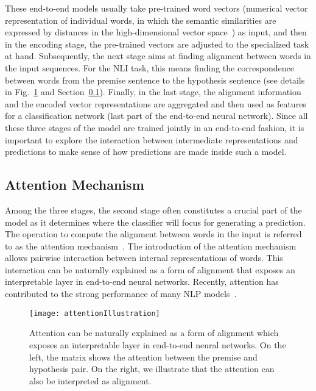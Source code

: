 These end-to-end models usually take pre-trained word vectors (numerical vector representation of individual words, in which the semantic similarities are expressed by distances in the high-dimensional vector space~\cite{MikolovSutskeverChen2013, PenningtonSocherManning2014}) as input, and then in the encoding stage, the pre-trained vectors are adjusted to the specialized task at hand. Subsequently, the next stage aims at finding alignment between words in the input sequences. For the NLI task, this means finding the correspondence between words from the premise sentence to the hypothesis sentence (see details in Fig.~\ref{fig:attention} and Section~\ref{sec:attention}). Finally, in the last stage, the alignment information and the encoded vector representations are aggregated and then used as features for a classification network (last part of the end-to-end neural network).
%
Since all these three stages of the model are trained jointly in an end-to-end fashion, it is important to explore the interaction between intermediate representations and predictions to make sense of how predictions are made inside such a model.

\subsection{Attention Mechanism}
\label{sec:attention}
Among the three stages, the second stage often constitutes a crucial part of the model as it determines where the classifier will focus for generating a prediction. The operation to compute the alignment between words in the input is referred to as the attention mechanism~\cite{bahdanau2014neural}. 
The introduction of the attention mechanism allows
pairwise interaction between internal representations of words. 
This interaction can be naturally explained as a form of alignment that exposes an interpretable layer in end-to-end neural networks.
%
Recently, attention has contributed to the strong performance of many NLP models~\cite{parikh2016emnlp,rush2015neural,yang2016hierarchical,seo2016bidirectional,schwartz2017high}.

\begin{figure}[htbp]
\centering
\vspace{-2mm}
 \texttt{[image: attentionIllustration]}
  \vspace{-2mm}
 \caption{Attention can be naturally explained as a form of alignment which exposes an interpretable layer in end-to-end neural networks. On the left, the matrix shows the attention between the premise and hypothesis pair. On the right, we illustrate that the attention can also be interpreted as alignment.}
\label{fig:attention}
\vspace{-2mm}
\end{figure}

